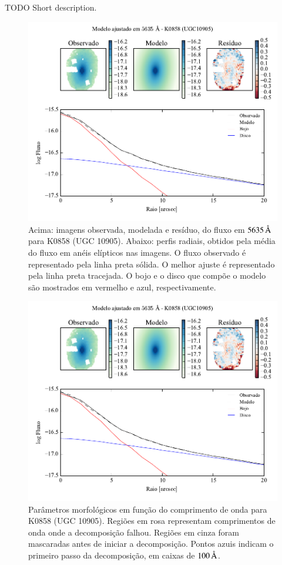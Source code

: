 TODO Short description.

\begin{figure}
	\includegraphics[page=1]{figuras-decomp/K0858_sample006a}
	\caption[Ajuste morfológico em $5635\,\angstrom$ de K0858 (UGC 10905)]
	{Acima: imagens observada, modelada e resíduo, do fluxo em $5635\,\angstrom$
	para K0858 (UGC 10905). Abaixo: perfis radiais, obtidos pela média do fluxo em
	anéis elípticos nas imagens. O fluxo observado é representado pela linha preta
	sólida. O melhor ajuste é representado pela linha preta tracejada. O bojo e o
	disco que compõe o modelo são mostrados em vermelho e azul, respectivamente.}
	\label{fig:decompRadprof:K0858}
\end{figure}

\begin{figure}
	\includegraphics[page=2]{figuras-decomp/K0858_sample006a}
	\caption[Parâmetros morfológicos em função do comprimento de onda de K0858
	(UGC 10905)]
	{Parâmetros morfológicos em função do comprimento de onda para
	K0858 (UGC 10905). Regiões em rosa representam comprimentos de onda onde a
	decomposição falhou. Regiões em cinza foram mascaradas antes de iniciar a
	decomposição. Pontos azuis indicam o primeiro passo da decomposição, em caixas
	de $100\,\text{\normalfont\AA}$.}
	\label{fig:decompParams:K0858}
\end{figure}

